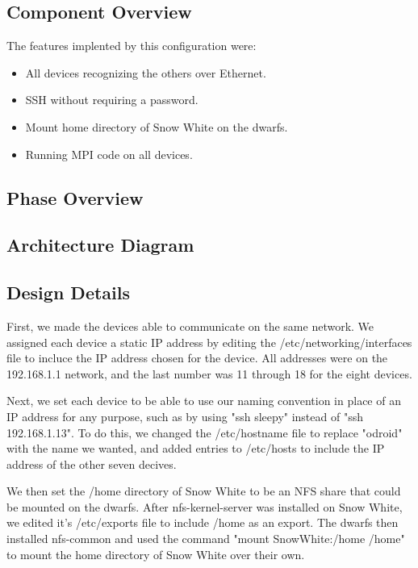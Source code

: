 \subsection{Component  Overview}
The features implented by this configuration were:

\begin{itemize}
	\item All devices recognizing the others over Ethernet.
	\item SSH without requiring a password.
	\item Mount home directory of Snow White on the dwarfs.
	\item Running MPI code on all devices.
\end{itemize}

\subsection{Phase Overview}

\subsection{ Architecture  Diagram}

\subsection{Design Details}
First, we made the devices able to communicate on the same network. We assigned each device a static IP address by editing the /etc/networking/interfaces file to incluce the IP address chosen for the device. All addresses were on the 192.168.1.1 network, and the last number was 11 through 18 for the eight devices.

Next, we set each device to be able to use our naming convention in place of an IP address for any purpose, such as by using "ssh sleepy" instead of "ssh 192.168.1.13". To do this, we changed the /etc/hostname file to replace "odroid" with the name we wanted, and added entries to /etc/hosts to include the IP address of the other seven decives. 

We then set the /home directory of Snow White to be an NFS share that could be mounted on the dwarfs. After nfs-kernel-server was installed on Snow White, we edited it's /etc/exports file to include /home as an export. The dwarfs then installed nfs-common and used the command "mount SnowWhite:/home /home" to mount the home directory of Snow White over their own.

